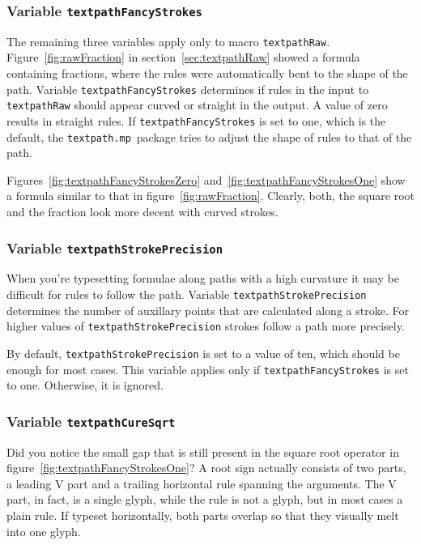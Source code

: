 \documentclass{article}
\newcommand*{\cmd}[1]{\texttt{#1}}
\newcommand*{\pkg}{\cmd{textpath.mp}}
\begin{document}
\subsubsection{Variable \cmd{textpathFancyStrokes}}
The remaining three variables apply only to macro \cmd{textpathRaw}.  Figure~\ref{fig:rawFraction} in section~\ref{sec:textpathRaw} showed a formula containing fractions, where the rules were automatically bent to the shape of the path.  Variable \cmd{textpathFancyStrokes} determines if rules in the input to \cmd{textpathRaw} should appear curved or straight in the output.  A value of zero results in straight rules.  If \cmd{textpathFancyStrokes} is set to one, which is the default, the \pkg\ package tries to adjust the shape of rules to that of the path.

Figures~\ref{fig:textpathFancyStrokesZero} and~\ref{fig:textpathFancyStrokesOne} show a formula similar to that in figure~\ref{fig:rawFraction}.  Clearly, both, the square root and the fraction look more decent with curved strokes.


\subsubsection{Variable \cmd{textpathStrokePrecision}}
When you're typesetting formulae along paths with a high curvature it may be difficult for rules to follow the path.  Variable \cmd{textpathStrokePrecision} determines the number of auxillary points that are calculated along a stroke.  For higher values of \cmd{textpathStrokePrecision} strokes follow a path more precisely.

By default, \cmd{textpathStrokePrecision} is set to a value of ten, which should be enough for most cases.  This variable applies only if \cmd{textpathFancyStrokes} is set to one.  Otherwise, it is ignored.


\subsubsection{Variable \cmd{textpathCureSqrt}}
Did you notice the small gap that is still present in the square root operator in figure~\ref{fig:textpathFancyStrokesOne}?  A root sign actually consists of two parts, a leading V part and a trailing horizontal rule spanning the arguments.  The V part, in fact, is a single glyph, while the rule is not a glyph, but in most cases a plain rule.  If typeset horizontally, both parts overlap so that they visually melt into one glyph.
\end{document}
